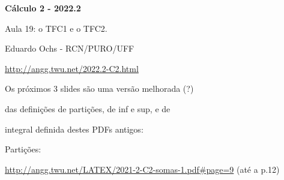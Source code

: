 \documentclass[oneside,12pt]{article}
\begin{document}
\thispagestyle{empty}

\begin{center}

\vspace*{1.2cm}

{\bf \Large Cálculo 2 - 2022.2}

\bsk

Aula 19: o TFC1 e o TFC2.

\bsk

Eduardo Ochs - RCN/PURO/UFF

\url{http://angg.twu.net/2022.2-C2.html}

\end{center}

\newpage

% 
% 
% 
% 
% 
% 
% 
% 
% 
% 
% 
% 
% 

\newpage

Os próximos 3 slides são uma versão melhorada (?)

das definições de partições, de inf e sup, e de

integral definida destes PDFs antigos:

\ssk

Partições:

{\scriptsize

\url{http://angg.twu.net/LATEX/2021-2-C2-somas-1.pdf\#page=9} (até a p.12)

}
\end{document}
